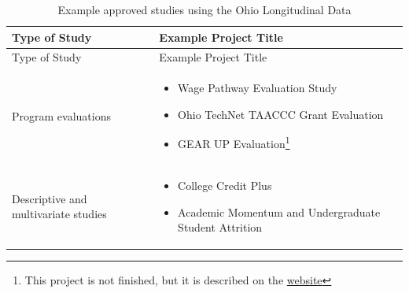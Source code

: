 \documentclass[
]{book}
\providecommand{\tightlist}{%
  \setlength{\itemsep}{0pt}\setlength{\parskip}{0pt}}
\begin{document}
\begin{longtable}[]{@{}ll@{}}
\caption{\label{tab:oldatable2} Example approved studies using the Ohio Longitudinal Data}\tabularnewline
\toprule
\begin{minipage}[b]{0.28\columnwidth}\raggedright
Type of Study\strut
\end{minipage} & \begin{minipage}[b]{0.66\columnwidth}\raggedright
Example Project Title\strut
\end{minipage}\tabularnewline
\midrule
\endfirsthead
\toprule
\begin{minipage}[b]{0.28\columnwidth}\raggedright
Type of Study\strut
\end{minipage} & \begin{minipage}[b]{0.66\columnwidth}\raggedright
Example Project Title\strut
\end{minipage}\tabularnewline
\midrule
\endhead
\begin{minipage}[t]{0.28\columnwidth}\raggedright
Program evaluations\strut
\end{minipage} & \begin{minipage}[t]{0.66\columnwidth}\raggedright
\begin{itemize}
\tightlist
\item
  Wage Pathway Evaluation
  Study \citep{hawley2019}
\item
  Ohio TechNet TAACCC
  Grant Evaluation
  \citep{newgrowthgrouptheohioeducationresearchcenter2018}
\item
  GEAR UP
  Evaluation\footnote{This project is not finished, but it is described on the \href{https://www.ohiohighered.org/gearup}{website}}
\end{itemize}\strut
\end{minipage}\tabularnewline
\begin{minipage}[t]{0.28\columnwidth}\raggedright
Descriptive and
multivariate studies\strut
\end{minipage} & \begin{minipage}[t]{0.66\columnwidth}\raggedright
\begin{itemize}
\tightlist
\item
  College Credit Plus
  \citep{harlow2018}
\item
  Academic Momentum and
  Undergraduate Student
  Attrition
  \citep{kondratjeva2017}
\end{itemize}\strut
\end{minipage}\tabularnewline
\bottomrule
\end{longtable}
\end{document}

